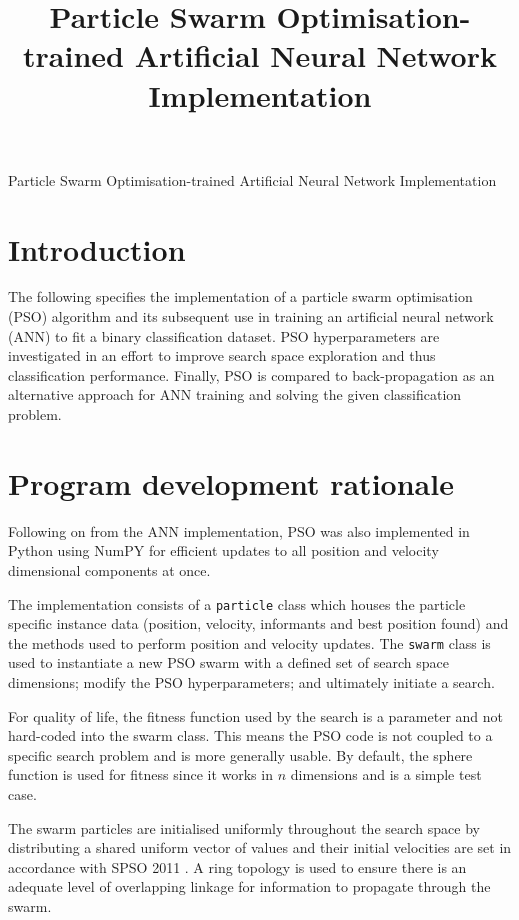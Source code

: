 \documentclass[12pt]{article}
\begin{document}
\title{Particle Swarm Optimisation-trained Artificial Neural Network Implementation}

\begin{center}
  \Large{Particle Swarm Optimisation-trained Artificial Neural Network Implementation}
\end{center}

\vspace{-2em}
\section{Introduction}

The following specifies the implementation of a particle swarm
optimisation (PSO) algorithm and its subsequent use in training an
artificial neural network (ANN) to fit a binary classification dataset.
PSO hyperparameters are investigated in an effort to improve search
space exploration and thus classification performance. Finally, PSO is compared to back-propagation as an alternative approach for ANN training and solving the given classification problem.

\vspace{-1.5em}
\section{Program development rationale}

Following on from the ANN implementation, PSO was also implemented in
Python using NumPY for efficient updates to all position and velocity
dimensional components at once.

The implementation consists of a \texttt{particle} class which houses the
particle specific instance data (position, velocity, informants and best position found) and the
methods used to perform position and velocity updates. The \texttt{swarm}
class is used to instantiate a new PSO swarm with a defined set of search space
dimensions; modify the PSO hyperparameters; and ultimately initiate a search.

For quality of life, the fitness function used by the search is a parameter
and not hard-coded into the swarm class. This means the PSO code is not coupled
to a specific search problem and is more generally usable. By default,
the sphere function is used for fitness since it works in \(n\) dimensions
and is a simple test case.

The swarm particles are initialised uniformly throughout the search space
by distributing a shared uniform vector of values and their initial velocities
are set in accordance with SPSO 2011 \cite{Clerc}. A ring topology \cite{Clerc} is used to ensure
there is an adequate level of overlapping linkage for information to propagate through
the swarm.
\end{document}
